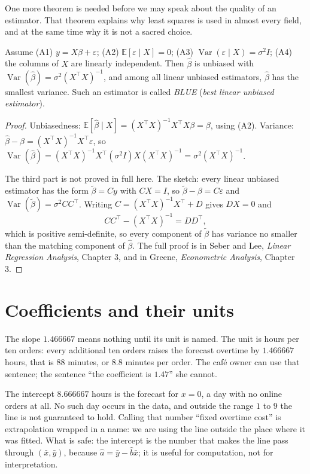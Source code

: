 One more theorem is needed before we may speak about the quality of an estimator. That theorem
explains why least squares is used in almost every field, and at the same time why it is not a
sacred choice.

\begin{teorema}
Assume (A1) $y=X\beta+\varepsilon$; (A2) $\mathbb{E}[\varepsilon\mid X]=0$;
(A3) $\operatorname{Var}(\varepsilon\mid X)=\sigma^2I$; (A4) the columns of $X$ are linearly
independent. Then $\hat\beta$ is unbiased with $\operatorname{Var}(\hat\beta)=\sigma^2
(X^{\top}X)^{-1}$, and among all linear unbiased estimators, $\hat\beta$ has the smallest
variance. Such an estimator is called \emph{BLUE} (\emph{best linear unbiased estimator}).
\end{teorema}

\begin{proof}[Proof]
Unbiasedness: $\mathbb{E}[\hat\beta\mid X]=(X^{\top}X)^{-1}X^{\top}X\beta=\beta$, using (A2).
Variance: $\hat\beta-\beta=(X^{\top}X)^{-1}X^{\top}\varepsilon$, so
$\operatorname{Var}(\hat\beta)=(X^{\top}X)^{-1}X^{\top}(\sigma^2I)X(X^{\top}X)^{-1}
=\sigma^2(X^{\top}X)^{-1}$.

The third part is not proved in full here. The sketch: every linear unbiased estimator has the
form $\tilde\beta=Cy$ with $CX=I$, so $\tilde\beta-\beta=C\varepsilon$ and
$\operatorname{Var}(\tilde\beta)=\sigma^2CC^{\top}$. Writing
$C=(X^{\top}X)^{-1}X^{\top}+D$ gives $DX=0$ and
\[
CC^{\top}-(X^{\top}X)^{-1}=DD^{\top},
\]
which is positive semi-definite, so every component of $\tilde\beta$ has variance no smaller
than the matching component of $\hat\beta$. The full proof is in Seber and Lee,
\emph{Linear Regression Analysis}, Chapter 3, and in Greene, \emph{Econometric Analysis},
Chapter 3.
\end{proof}

\section{Coefficients and their units}

The slope $1.466667$ means nothing until its unit is named. The unit is hours per ten orders:
every additional ten orders raises the forecast overtime by $1.466667$ hours, that is $88$
minutes, or $8.8$ minutes per order. The café owner can use that sentence; the sentence ``the
coefficient is $1.47$'' she cannot.

The intercept $8.666667$ hours is the forecast for $x=0$, a day with no online orders at all.
No such day occurs in the data, and outside the range $1$ to $9$ the line is not guaranteed to
hold. Calling that number ``fixed overtime cost'' is extrapolation wrapped
in a name: we are using the line outside the place where it was fitted. What is safe: the
intercept is the number that makes the line pass through $(\bar x,\bar y)$, because
$\hat a=\bar y-\hat b\bar x$; it is useful for computation, not for interpretation.


